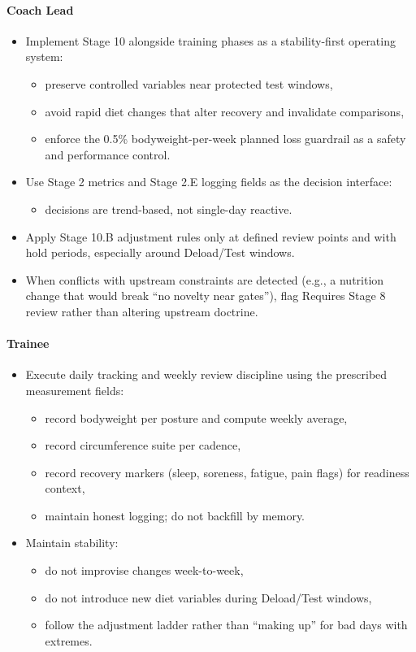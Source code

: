 \documentclass[10pt]{article}
\begin{document}
\paragraph*{Coach Lead}

\begin{itemize}
\item Implement Stage 10 alongside training phases as a stability-first operating system:
  \begin{itemize}
  \item preserve controlled variables near protected test windows,
  \item avoid rapid diet changes that alter recovery and invalidate comparisons,
  \item enforce the 0.5\% bodyweight-per-week planned loss guardrail as a safety and performance control.
  \end{itemize}
\item Use Stage 2 metrics and Stage 2.E logging fields as the decision interface:
  \begin{itemize}
  \item decisions are trend-based, not single-day reactive.
  \end{itemize}
\item Apply Stage 10.B adjustment rules only at defined review points and with hold periods, especially around Deload/Test windows.
\item When conflicts with upstream constraints are detected (e.g., a nutrition change that would break “no novelty near gates”), flag Requires Stage 8 review rather than altering upstream doctrine.
\end{itemize}

\paragraph*{Trainee}

\begin{itemize}
\item Execute daily tracking and weekly review discipline using the prescribed measurement fields:
  \begin{itemize}
  \item record bodyweight per posture and compute weekly average,
  \item record circumference suite per cadence,
  \item record recovery markers (sleep, soreness, fatigue, pain flags) for readiness context,
  \item maintain honest logging; do not backfill by memory.
  \end{itemize}
\item Maintain stability:
  \begin{itemize}
  \item do not improvise changes week-to-week,
  \item do not introduce new diet variables during Deload/Test windows,
  \item follow the adjustment ladder rather than “making up” for bad days with extremes.
  \end{itemize}
\end{itemize}
\end{document}
